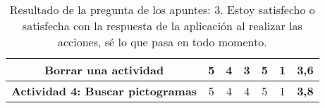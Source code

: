 \begin{table}[H]
{\begin{tabular}{c|cccccc|}
            \multicolumn{1}{|c|}{\textbf{Borrar una actividad}}            & \multicolumn{1}{c|}{5}                                                                                                                                                                                & \multicolumn{1}{c|}{4}                  & \multicolumn{1}{c|}{3}                  & \multicolumn{1}{c|}{5}                  & \multicolumn{1}{c|}{1}                  & \textbf{3,6}   \\ \hline
            \multicolumn{1}{|c|}{\textbf{Actividad 4: Buscar pictogramas}} & \multicolumn{1}{c|}{5}                                                                                                                                                                                & \multicolumn{1}{c|}{4}                  & \multicolumn{1}{c|}{4}                  & \multicolumn{1}{c|}{5}                  & \multicolumn{1}{c|}{1}                  & \textbf{3,8}   \\ \hline
        \end{tabular}%
    }
    \caption{Resultado de la pregunta de los apuntes: 3. Estoy satisfecho o satisfecha con la respuesta de la aplicación al realizar las acciones, sé lo que pasa en todo momento.}
    \label{tab:pregunta3Apunte}
\end{table}



